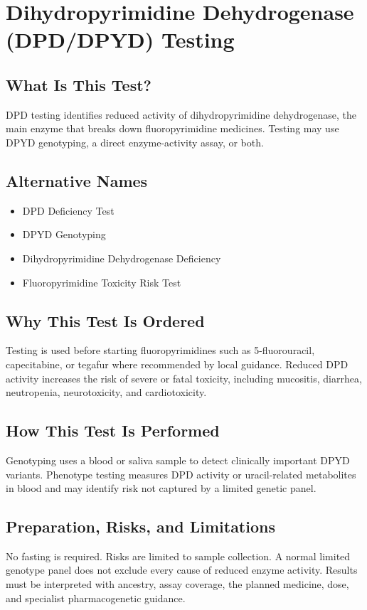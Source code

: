 \chapter{Dihydropyrimidine Dehydrogenase (DPD/DPYD) Testing}

\section*{What Is This Test?}
DPD testing identifies reduced activity of dihydropyrimidine dehydrogenase, the main enzyme that breaks down fluoropyrimidine medicines. Testing may use DPYD genotyping, a direct enzyme-activity assay, or both.

\section*{Alternative Names}
\begin{itemize}
  \item DPD Deficiency Test
  \item DPYD Genotyping
  \item Dihydropyrimidine Dehydrogenase Deficiency
  \item Fluoropyrimidine Toxicity Risk Test
\end{itemize}
\section*{Why This Test Is Ordered}
Testing is used before starting fluoropyrimidines such as 5-fluorouracil, capecitabine, or tegafur where recommended by local guidance. Reduced DPD activity increases the risk of severe or fatal toxicity, including mucositis, diarrhea, neutropenia, neurotoxicity, and cardiotoxicity.

\section*{How This Test Is Performed}
Genotyping uses a blood or saliva sample to detect clinically important DPYD variants. Phenotype testing measures DPD activity or uracil-related metabolites in blood and may identify risk not captured by a limited genetic panel.

\section*{Preparation, Risks, and Limitations}
No fasting is required. Risks are limited to sample collection. A normal limited genotype panel does not exclude every cause of reduced enzyme activity. Results must be interpreted with ancestry, assay coverage, the planned medicine, dose, and specialist pharmacogenetic guidance.

